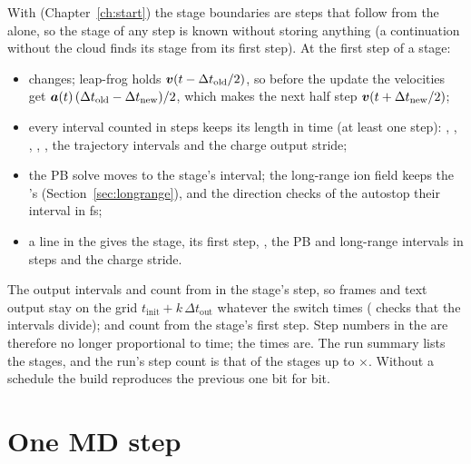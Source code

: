 With  (Chapter~\ref{ch:start}) the stage boundaries are steps that follow from the
 alone, so the stage of any step is known without storing anything (a continuation without the cloud finds
its stage from its first step).
At the first step of a stage:
\begin{itemize}
  \item {} changes; leap-frog holds $\bm{v}(t-\Delta t_{\mathrm{old}}/2)$, so before the update the velocities
    get $\bm{a}(t)\,(\Delta t_{\mathrm{old}}-\Delta t_{\mathrm{new}})/2$, which makes the next half step
    $\bm{v}(t+\Delta t_{\mathrm{new}}/2)$;
  \item every interval counted in steps keeps its length in time (at least one step): ,
    , , , , the trajectory intervals and
    the charge output stride;
  \item the PB solve moves to the stage's interval; the long-range ion field keeps the 's
    (Section~\ref{sec:longrange}), and the direction checks of the autostop their interval in fs;
  \item a line in the  gives the stage, its first step, , the PB and long-range intervals in steps
    and the charge stride.
\end{itemize}
The output intervals and  count from  in the stage's step, so frames and text output
stay on the grid $t_{\mathrm{init}}+k\,\Delta t_{\mathrm{out}}$ whatever the switch times ( checks that the
intervals divide);  and  count from the stage's first step.
Step numbers in the  are therefore no longer proportional to time; the times are.
The run summary lists the stages, and the run's step count is that of the stages up to
$\times$.
Without a schedule the build reproduces the previous one bit for bit.

\section{One MD step}

